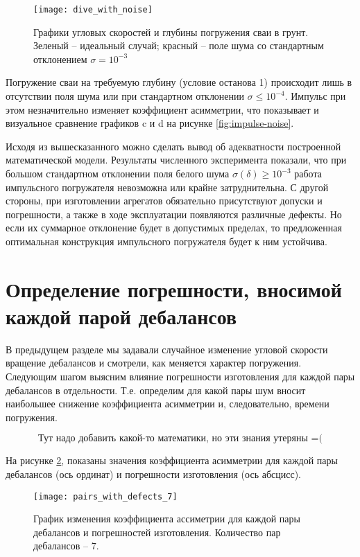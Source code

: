 \begin{figure}[ht]
    \centering
    \texttt{[image: dive\_with\_noise]}
    \caption{Графики угловых скоростей и глубины погружения сваи в грунт.
    Зеленый -- идеальный случай; красный -- поле шума со стандартным отклонением $\sigma = 10^{-3}$}
    \label{fig:dive_with_noise}
\end{figure}

Погружение сваи на требуемую глубину (условие останова 1) происходит лишь в отсутствии поля шума или
при стандартном отклонении $\sigma \leq 10^{-4}$. Импульс при этом незначительно изменяет коэффициент асимметрии,
что показывает и визуальное сравнение графиков c и d на рисунке \ref{fig:impulse-noise}.

Исходя из вышесказанного можно сделать вывод об адекватности построенной математической модели. Результаты численного
эксперимента показали, что при большом стандартном отклонении поля белого шума $\sigma(\delta) \geq 10^{-3}$ работа
импульсного погружателя невозможна или крайне затруднительна. С другой стороны, при изготовлении агрегатов обязательно
присутствуют допуски и погрешности, а также в ходе эксплуатации появляются различные дефекты. Но если их суммарное отклонение
будет в допустимых пределах, то предложенная оптимальная конструкция импульсного погружателя будет к ним устойчива.

\section{Определение погрешности, вносимой каждой парой дебалансов}

В предыдущем разделе мы задавали случайное изменение угловой скорости вращение дебалансов и смотрели, как меняется характер погружения.
Следующим шагом выясним влияние погрешности изготовления для каждой пары дебалансов в отдельности. Т.е. определим для какой пары шум вносит
наибольшее снижение коэффициента асимметрии и, следовательно, времени погружения.

\begin{equation}
    \text{Тут надо добавить какой-то математики, но эти знания утеряны =(}
\end{equation}

На рисунке \ref{fig:pairs_with_defects_7}, показаны значения коэффициента асимметрии для каждой
пары дебалансов (ось ординат) и погрешности изготовления (ось абсцисс).

\begin{figure}[ht]
    \centering
    \texttt{[image: pairs\_with\_defects\_7]}
    \caption{График изменения коэффициента ассиметрии для каждой пары дебалансов и погрешностей изготовления.
    Количество пар дебалансов -- 7.}
    \label{fig:pairs_with_defects_7}
\end{figure}

